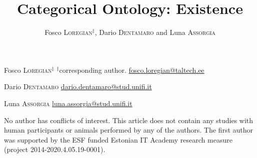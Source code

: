 \documentclass[a4paper,9pt]{../birkjour}
\title{Categorical Ontology: Existence}
\author{Fosco \textsc{Loregian}$^\ddag$, Dario \textsc{Dentamaro} and Luna \textsc{Assorgia}}
\begin{document}
\scriptsize

\maketitle

\begin{center}
\begin{minipage}{.32\textwidth}
  Fosco \textsc{Loregian}$^\ddag$\newline
  $^\ddag$corresponding author. \newline
\url{fosco.loregian@taltech.ee}
\end{minipage}\hfill %
\begin{minipage}{.32\textwidth}
  Dario \textsc{Dentamaro} \newline
  \url{dario.dentamaro@stud.unifi.it}
\end{minipage}\hfill %
\begin{minipage}{.32\textwidth}
  Luna \textsc{Assorgia} \newline
  \url{luna.assorgia@stud.unifi.it}
\end{minipage}
\end{center}

\vspace*{\fill}%
\normalsize
No author has conflicts of interest. This article does not contain any studies with human participants or animals performed by any of the authors. The first author was supported by the ESF funded Estonian IT Academy research measure (project 2014-2020.4.05.19-0001).
\end{document}
